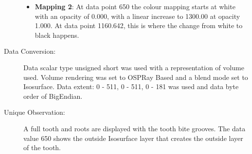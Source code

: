 \begin{description}
	\begin{itemize}
		\tightlist
		\item
		\textbf{Mapping 2}: 
		\hfill \break
			At data point 650 the colour mapping starts at white with an opacity of 0.000, with a linear increase to 1300.00 at opacity 1.000. At data point 1160.642, this is where the change from white to black happens.
	\end{itemize}
	
	\item[Data Conversion:] 
	\hfill \break
		Data scalar type unsigned short was used with a representation of volume used. Volume rendering was set to OSPRay Based and a blend mode set to Isosurface. Data extent: 0 - 511, 0 - 511, 0 - 181 was used and data byte order of BigEndian.
	
	\item[Unique Observation:]
	\hfill \break
		A full tooth and roots are displayed with the tooth bite grooves. The data value 650 shows the outside Isosurface layer that creates the outside layer of the tooth.
	
\end{description}